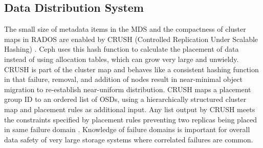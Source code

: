 \documentclass[9pt,twocolumn,twoside]{styles/osajnl}
\begin{document}
\subsection{Data Distribution System}
The small size of metadata items in the MDS and the compactness of
cluster maps in RADOS are enabled by CRUSH (Controlled Replication
Under Scalable Hashing) \cite{MDS}. Ceph uses this hash function to
calculate the placement of data instead of using allocation tables,
which can grow very large and unwieldy. CRUSH is part of the cluster
map and behaves like a consistent hashing function in that failure,
removal, and addition of nodes result in near-minimal object migration
to re-establish near-uniform distribution. CRUSH maps a placement
group ID to an ordered list of OSDs, using a hierarchically structured
cluster map and placement rules as additional input. Any list output
by CRUSH meets the constraints specified by placement rules preventing
two replicas being placed in same failure domain
\cite{paper-Ceph}. Knowledge of failure domains is important for
overall data safety of very large storage systems where correlated
failures are common.
\end{document}
